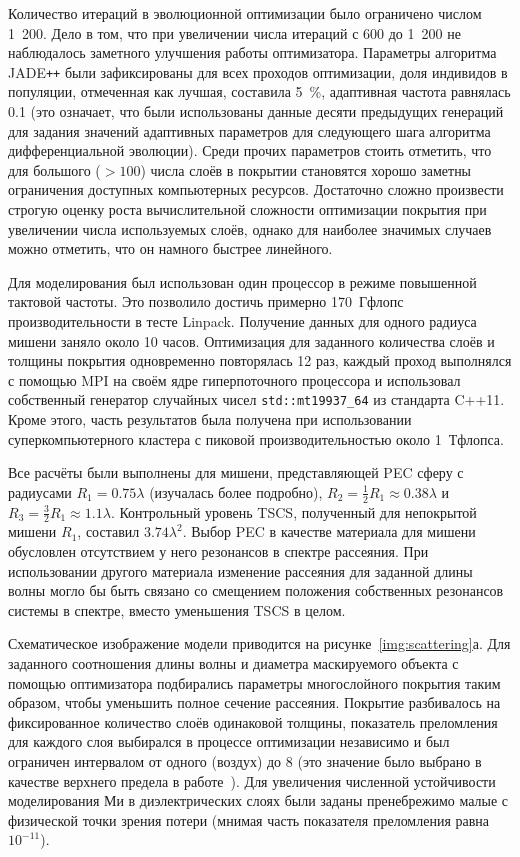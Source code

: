 Количество итераций в эволюционной оптимизации было ограничено числом
1~200. Дело в том, что при увеличении числа итераций с 600 до 1~200 не
наблюдалось заметного улучшения работы оптимизатора. 
Параметры алгоритма JADE\texttt{++} были зафиксированы для всех проходов
оптимизации, доля индивидов в популяции, отмеченная как лучшая,
составила 5~\%, адаптивная частота равнялась 0.1 (это означает, что
были использованы данные десяти предыдущих генераций для задания
значений адаптивных параметров для следующего шага алгоритма
дифференциальной эволюции).  Среди прочих параметров стоить отметить,
что для большого ($>100$) числа слоёв в покрытии становятся хорошо
заметны ограничения доступных компьютерных ресурсов. Достаточно
сложно произвести строгую оценку роста вычислительной сложности
оптимизации покрытия при увеличении числа используемых слоёв, однако
для наиболее значимых случаев можно отметить, что он намного быстрее
линейного.

Для моделирования был использован один процессор в режиме повышенной
тактовой частоты. Это позволило достичь примерно 170~Гфлопс
производительности в тесте Linpack. Получение данных для одного
радиуса мишени заняло около 10 часов. Оптимизация для
заданного количества слоёв и толщины покрытия одновременно повторялась
12 раз, каждый проход выполнялся с помощью MPI на своём
ядре гиперпоточного процессора и использовал собственный генератор
случайных чисел \verb+std::mt19937_64+ из стандарта C++11. Кроме
этого, часть результатов была получена при использовании
суперкомпьютерного кластера с пиковой производительностью около
1~Тфлопса.

Все расчёты были выполнены для мишени, представляющей PEC сферу с
радиусами ${R_1 = 0.75\lambda}$ (изучалась более подробно),
${R_2 = \frac{1}{2}R_1\approx 0.38\lambda}$ и
${R_3 = \frac{3}{2}R_1 \approx 1.1\lambda}$.  Контрольный уровень
TSCS, полученный для непокрытой мишени ${R_1}$, составил
$3.74\lambda^2$.  Выбор PEC в качестве материала для мишени обусловлен
отсутствием у него резонансов в спектре рассеяния. При использовании
другого материала изменение рассеяния для заданной длины волны могло
бы быть связано со смещением положения собственных резонансов системы
в спектре, вместо уменьшения TSCS в целом.

Схематическое изображение модели приводится на
рисунке~\ref{img:scattering}а. Для заданного соотношения длины волны
и диаметра маскируемого объекта с помощью оптимизатора подбирались
параметры многослойного покрытия таким образом, чтобы уменьшить полное
сечение рассеяния.  Покрытие разбивалось на фиксированное количество
слоёв одинаковой толщины, показатель преломления для каждого слоя
выбирался в процессе оптимизации независимо и был ограничен интервалом
от одного (воздух) до $8$ (это значение было выбрано в качестве
верхнего предела в работе~\cite{semouchkina2}).  Для увеличения
численной устойчивости моделирования Ми в диэлектрических слоях были
заданы пренебрежимо малые с физической точки зрения потери (мнимая
часть показателя преломления равна $10^{-11}$).

